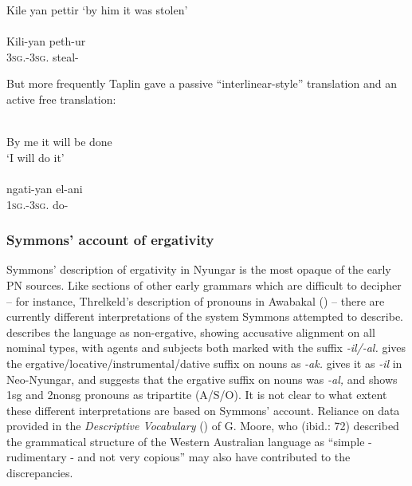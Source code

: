 \ea\label{ex:key:53}
	Kile    yan          pettir
	\glt `by him it was stolen' \\
	\citep[88]{taplin_notes_1872} \\
	\gll Kili-yan             peth-ur\\
	3\textsc{sg}.-3\textsc{sg}.       steal-\\
\z

But more frequently Taplin gave a passive “interlinear-style” translation and an active free translation:

\ea\label{ex:key:54}
	 \\
	{By me it will be done} \\
	\glt `I will do it' \\
	\citep[88]{taplin_notes_1872} \\
	\gll ngati-yan      el-ani\\
	1\textsc{sg}.-3\textsc{sg}.    do-\\
\z

\subsubsection{Symmons' account of ergativity}
\label{sec:key:7.1.1.2}\label{bkm:Ref74322244}

Symmons' description of ergativity in Nyungar is the most opaque of the early PN sources. Like sections of other early grammars which are difficult to decipher – for instance, Threlkeld’s description of pronouns in Awabakal () – there are currently different interpretations of the system Symmons attempted to describe. \citet[54--55]{thieberger_linguistic_2004} describes the language as non-ergative, showing accusative alignment on all nominal types, with agents and subjects both marked with the suffix \textit{-il/-al.} \citet[65]{blake_case_1977} gives the ergative/locative/instrumental/dative suffix on nouns as \textit{-ak.} \citet[64]{douglas_aboriginal_1968} gives it as \textit{-il} in Neo-Nyungar, and \citet[313]{dixon_australian_2002} suggests that the ergative suffix on nouns was \textit{-al,} and shows 1sg and 2nonsg pronouns as tripartite (A/S/O). It is not clear to what extent these different interpretations are based on Symmons' account. Reliance on data provided in the \textit{Descriptive Vocabulary} (\citeyear{moore_descriptive_1842}) of G. Moore, who (ibid.: 72) described the grammatical structure of the Western Australian language as “simple - rudimentary - and not very copious” may also have contributed to the discrepancies.

